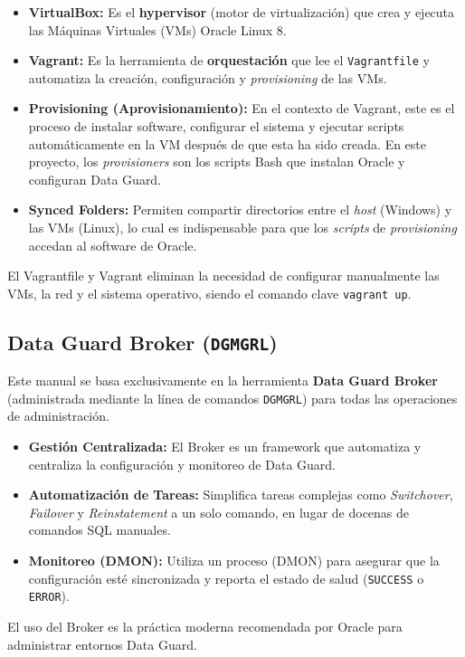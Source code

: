 \documentclass[11pt, a4paper]{report}
\begin{document}
\begin{itemize}
    \item \textbf{VirtualBox:} Es el \textbf{hypervisor} (motor de virtualización) que crea y ejecuta las Máquinas Virtuales (VMs) Oracle Linux 8.
    \item \textbf{Vagrant:} Es la herramienta de \textbf{orquestación} que lee el \texttt{Vagrantfile} y automatiza la creación, configuración y \textit{provisioning} de las VMs.
    \item \textbf{Provisioning (Aprovisionamiento):} En el contexto de Vagrant, este es el proceso de instalar software, configurar el sistema y ejecutar scripts automáticamente en la VM después de que esta ha sido creada. En este proyecto, los \textit{provisioners} son los scripts Bash que instalan Oracle y configuran Data Guard.
    \item \textbf{Synced Folders:} Permiten compartir directorios entre el \textit{host} (Windows) y las VMs (Linux), lo cual es indispensable para que los \textit{scripts} de \textit{provisioning} accedan al software de Oracle.
\end{itemize}

El Vagrantfile y Vagrant eliminan la necesidad de configurar manualmente las VMs, la red y el sistema operativo, siendo el comando clave \texttt{vagrant up}.

\subsection{Data Guard Broker (\texttt{DGMGRL})}
Este manual se basa exclusivamente en la herramienta \textbf{Data Guard Broker} (administrada mediante la línea de comandos \texttt{DGMGRL}) para todas las operaciones de administración.

\begin{itemize}
    \item \textbf{Gestión Centralizada:} El Broker es un framework que automatiza y centraliza la configuración y monitoreo de Data Guard.
    \item \textbf{Automatización de Tareas:} Simplifica tareas complejas como \textit{Switchover}, \textit{Failover} y \textit{Reinstatement} a un solo comando, en lugar de docenas de comandos SQL manuales.
    \item \textbf{Monitoreo (DMON):} Utiliza un proceso (DMON) para asegurar que la configuración esté sincronizada y reporta el estado de salud (\texttt{SUCCESS} o \texttt{ERROR}).
\end{itemize}
El uso del Broker es la práctica moderna recomendada por Oracle para administrar entornos Data Guard.
\end{document}
